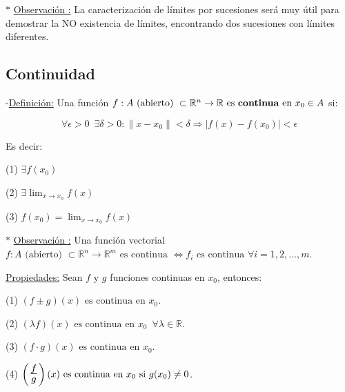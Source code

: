 \documentclass[10pt, titlepage]{article}
\newcommand{\R}{\mathbb{R}}
\newcommand{\bfrac}[2]{\scalebox{1.4}{$\frac{#1}{#2}$}}
\newcommand{\spac}{\, \, \,}
\newcommand{\definicion}{\noindent-\underline{Definición:} }
\newcommand{\observacion}[1][\!\!]{\noindent$\ast$ \underline{Observación #1:} }
\begin{document}
\observacion La caracterización de límites por sucesiones será muy útil para demostrar la NO existencia de 
límites, encontrando dos sucesiones con límites diferentes.
\vspace{7mm}


\subsection{Continuidad}
\vspace{5mm}

\definicion Una función $f : A \text{ (abierto) } \subset \R^n \to \R \text{ es \textbf{continua} en } x_0 \in 
A$ si:

\[
\boxed{
\forall{\epsilon > 0} \spac \exists{\delta > 0} : \|x - x_0\| < \delta \Rightarrow |f (x) - f (x_0)| 
< \epsilon
}
\]
\vspace{3mm}

Es decir:
\vspace{3mm}

(1) $\exists f (x_0)$
\vspace{3mm}

(2) $\exists \displaystyle \lim_{x \to x_0} f (x)$
\vspace{2mm}

(3) $f (x_0) = \displaystyle \lim_{x \to x_0} f (x)$
\vspace{5mm}

\observacion Una función vectorial $f : A \text{ (abierto) } \subset \R^n \to \R^m \text{ es continua } \iff 
f_i \text{ es continua } \forall{i = 1, 2,..., m}$.
\vspace{5mm}

\underline{Propiedades:} Sean $f \text{ y } g$ funciones continuas en $x_0$, entonces:
\vspace{3mm}

\indent \indent (1) $(f \pm g) (x) \text{ es continua en } x_0$.
\vspace{3mm}

\indent \indent (2) $(\lambda f) (x) \text{ es continua en } x_0 \spac \forall{\lambda \in \R}$.
\vspace{3mm}

\indent \indent (3) $(f \cdot g) (x) \text{ es continua en } x_0$.
\vspace{3mm}

\indent \indent (4) $\left ( \bfrac{f}{g} \right ) (x) \text{ es continua en } x_0 \text{ si } g (x_0) \neq 0$.
\vspace{3mm}
\end{document}
